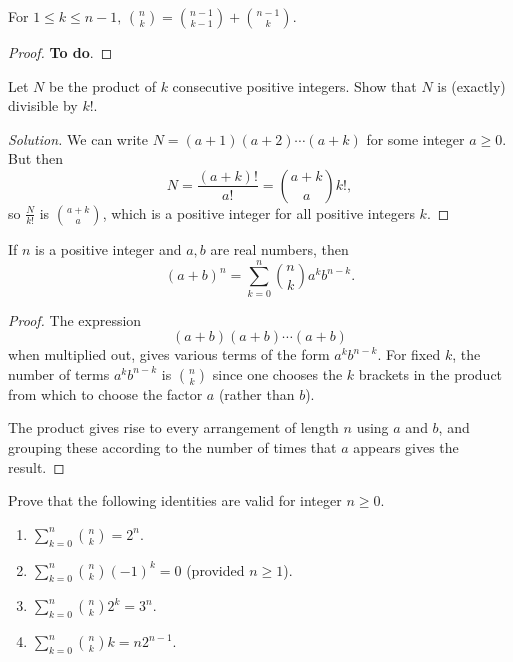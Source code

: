 \documentclass[10pt, a4paper]{article}
\begin{document}
\begin{proposition}
    For $1 \leq k \leq n - 1,\, \binom{n}{k} = \binom{n - 1}{k - 1} + \binom{n - 1}{k}$.
    \begin{proof}
        \textbf{To do}.
    \end{proof}
\end{proposition}

\begin{example}
    Let $N$ be the product of $k$ consecutive positive integers. Show that $N$ is (exactly) divisible by $k!$.
    \begin{proof}[Solution]
        We can write $N = (a + 1)(a + 2)\dotsi (a + k)$ for some integer $a \geq 0$. But then
        \[
        N = \frac{(a + k)!}{a!} = \binom{a + k}{a}k!,
        \]
        so $\frac{N}{k!}$ is $\binom{a + k}{a}$, which is a positive integer for all positive integers $k$.
    \end{proof}
\end{example}

\begin{theorem}
    If $n$ is a positive integer and $a, b$ are real numbers, then
    \[
    (a + b) ^ n = \sum_{k = 0}^{n}\binom{n}{k}a ^ {k} b ^ {n - k}.
    \]
    \begin{proof}
        The expression
        \[
        (a + b)(a + b) \dotsi (a + b)
        \]
        when multiplied out, gives various terms of the form $a ^ k b ^ {n - k}$. For fixed $k$, the number of terms $a ^ {k} b ^ {n - k}$ is $\binom{n}{k}$ since one chooses the $k$ brackets in the product from which to choose the factor $a$ (rather than $b$).

        The product gives rise to every arrangement of length $n$ using $a$ and $b$, and grouping these according to the number of times that $a$ appears gives the result.
    \end{proof}
\end{theorem}

Prove that the following identities are valid for integer $n \geq 0$.
\begin{enumerate}[label = (C\arabic*)]
    \item $\sum_{k = 0}^{n}\binom{n}{k} = 2 ^ n$.
    \item $\sum_{k = 0}^{n}\binom{n}{k}(-1) ^ k = 0$ (provided $n \geq 1$).
    \item $\sum_{k = 0}^{n}\binom{n}{k}2 ^ k = 3 ^ n$.
    \item $\sum_{k = 0}^{n}\binom{n}{k}k = n2 ^ {n - 1}$.
\end{enumerate}
\end{document}
